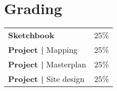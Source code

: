 \documentclass[11pt,article,oneside]{memoir}
\begin{document}
%
%
%
%
%
%
%
%
%
%
%

\section{Grading}
%
\begin{table}[H]
\small
\begin{tabular}{l l}
%
\textbf{Sketchbook} & 25\% \\
\textbf{Project |} Mapping & 25\% \\
\textbf{Project |} Masterplan & 25\% \\
\textbf{Project |} Site design & 25\% \\
%
\end{tabular}
\end{table}
\end{document}
